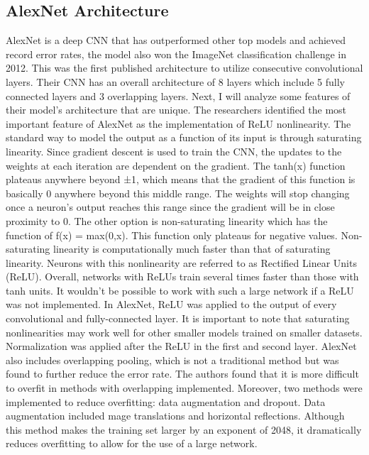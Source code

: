 \documentclass[10pt,twocolumn]{article}
\begin{document}
\subsection{AlexNet Architecture}
AlexNet is a deep CNN that has outperformed other top models and achieved record error rates, the model also won the ImageNet classification challenge in 2012. This was the first published architecture to utilize consecutive convolutional layers. Their CNN has an overall architecture of 8 layers which include 5 fully connected layers and 3 overlapping layers. Next, I will analyze some features of their model’s architecture that are unique. The researchers identified the most important feature of AlexNet as the implementation of ReLU nonlinearity. The standard way to model the output as a function of its input is through saturating linearity. Since gradient descent is used to train the CNN, the updates to the weights at each iteration are dependent on the gradient. The tanh(x) function plateaus anywhere beyond ±1, which means that the gradient of this function is basically 0 anywhere beyond this middle range. The weights will stop changing once a neuron’s output reaches this range since the gradient will be in close proximity to 0. The other option is non-saturating linearity which has the function of f(x) = max(0,x). This function only plateaus for negative values. Non-saturating linearity is computationally much faster than that of saturating linearity. Neurons with this nonlinearity are referred to as Rectified Linear Units (ReLU). Overall, networks with ReLUs train several times faster than those with tanh units. It wouldn’t be possible to work with such a large network if a ReLU was not implemented. In AlexNet, ReLU was applied to the output of every convolutional and fully-connected layer. It is important to note that saturating nonlinearities may work well for other smaller models trained on smaller datasets. Normalization was applied after the ReLU in the first and second layer. AlexNet also includes overlapping pooling, which is not a traditional method but was found to further reduce the error rate. The authors found that it is more difficult to overfit in methods with overlapping implemented. Moreover, two methods were implemented to reduce overfitting: data augmentation and dropout. Data augmentation included mage translations and horizontal reflections. Although this method makes the training set larger by an exponent of 2048, it dramatically reduces overfitting to allow for the use of a large network.
\end{document}
